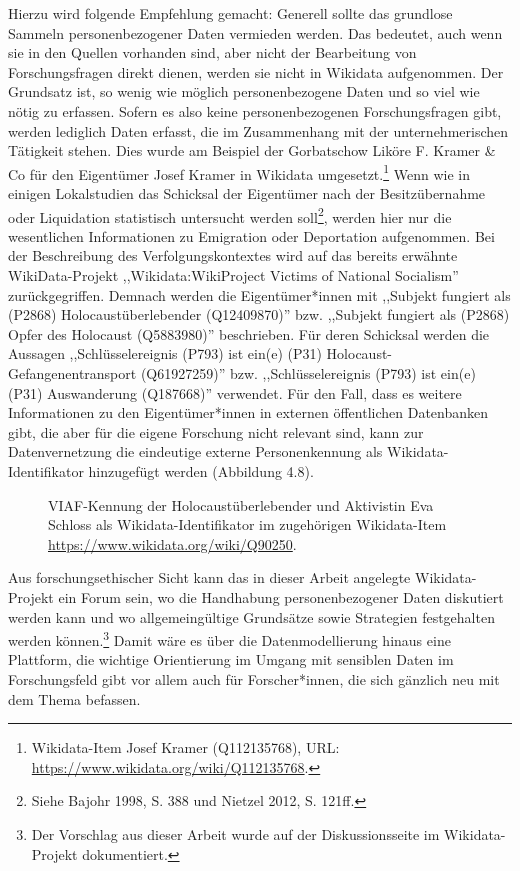 Hierzu wird folgende Empfehlung gemacht: Generell sollte das grundlose Sammeln personenbezogener Daten vermieden werden. Das bedeutet, auch wenn sie in den Quellen vorhanden sind, aber nicht der Bearbeitung von Forschungsfragen direkt dienen, werden sie nicht in Wikidata aufgenommen. Der Grundsatz ist, so wenig wie möglich personenbezogene Daten und so viel wie nötig zu erfassen. Sofern es also keine personenbezogenen Forschungsfragen gibt, werden lediglich Daten erfasst, die im Zusammenhang mit der unternehmerischen Tätigkeit stehen. Dies wurde am Beispiel der Gorbatschow Liköre F. Kramer \& Co für den Eigentümer Josef Kramer in Wikidata umgesetzt.\footnote{Wikidata-Item Josef Kramer (Q112135768), URL: \url{https://www.wikidata.org/wiki/Q112135768}.} Wenn wie in einigen Lokalstudien das Schicksal der Eigentümer nach der Besitzübernahme oder Liquidation statistisch untersucht werden soll\footnote{Siehe Bajohr 1998, S. 388 und Nietzel 2012, S. 121ff.}, werden hier nur die wesentlichen Informationen zu Emigration oder Deportation aufgenommen. Bei der Beschreibung des Verfolgungskontextes wird auf das bereits erwähnte WikiData-Projekt ,,Wikidata:WikiProject Victims of National Socialism'' zurückgegriffen. Demnach werden die Eigentümer*innen mit ,,Subjekt fungiert als (P2868) Holocaustüberlebender (Q12409870)'' bzw. ,,Subjekt fungiert als (P2868) Opfer des Holocaust (Q5883980)'' beschrieben. Für deren Schicksal werden die Aussagen ,,Schlüsselereignis (P793) ist ein(e) (P31) Holocaust-Gefangenentransport (Q61927259)'' bzw. ,,Schlüsselereignis (P793) ist ein(e) (P31) Auswanderung (Q187668)'' verwendet. Für den Fall, dass es weitere Informationen zu den Eigentümer*innen in externen öffentlichen Datenbanken gibt, die aber für die eigene Forschung nicht relevant sind, kann zur Datenvernetzung die eindeutige externe Personenkennung als Wikidata-Identifikator hinzugefügt werden (Abbildung 4.8).

\begin{figure}[h]
    \centering
    \caption{VIAF-Kennung der Holocaustüberlebender und Aktivistin Eva Schloss als Wikidata-Identifikator im zugehörigen Wikidata-Item \url{https://www.wikidata.org/wiki/Q90250}.}
    \label{fig:x cubed graph}
\end{figure}

Aus forschungsethischer Sicht kann das in dieser Arbeit angelegte Wikidata-Projekt ein Forum sein, wo die Handhabung personenbezogener Daten diskutiert werden kann und wo allgemeingültige Grundsätze sowie Strategien festgehalten werden können.\footnote{Der Vorschlag aus dieser Arbeit wurde auf der Diskussionsseite im Wikidata-Projekt dokumentiert.} Damit wäre es über die Datenmodellierung hinaus eine Plattform, die wichtige Orientierung im Umgang mit sensiblen Daten im Forschungsfeld gibt vor allem auch für Forscher*innen, die sich gänzlich neu mit dem Thema befassen.

